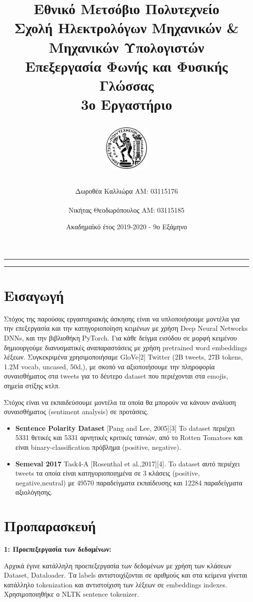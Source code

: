 \documentclass[12pt]{article}
\title{\Large Εθνικό Μετσόβιο Πολυτεχνείο \\
Σχολή Ηλεκτρολόγων Μηχανικών \& Μηχανικών Υπολογιστών\\
Επεξεργασία Φωνής και Φυσικής Γλώσσας\\
3ο Εργαστήριο \begin{figure}[h]
\centering
\includegraphics[width=0.2\textwidth]{ntua.jpg}
\end{figure}
}
\author{ \Large  Δωροθέα Καλλιώρα  ΑΜ: 03115176\\ \\
     \Large  Νικήτας Θεοδωρόπουλος AM: 03115185}
\date{Ακαδημαϊκό έτος 2019-2020 - 9ο Εξάμηνο}
\begin{document}
\maketitle
\begin{center}
\end{center}
\bigbreak
\vspace{.5em} \hrule \vspace{.2em} \hrule


\section{Εισαγωγή}


Στόχος της παρούσας εργαστηριακής άσκησης είναι να υπλοποιήσουμε μοντέλα για την επεξεργασία και την κατηγοριοποίηση κειμένων με χρήση Deep Neural Networks DNNs, και την βιβλιοθήκη PyTorch. Για κάθε δείγμα εισόδου σε μορφή κειμένου δημιουργούμε διανυσματικές αναπαραστάσεις με χρήση pretrained word embeddings λέξεων. Συγκεκριμένα χρησιμοποιήσαμε GloVe[2] Twitter (2B tweets, 27B tokens, 1.2M vocab, uncased, 50d,), με σκοπό να αξιοποιήσουμε την πληροφορία συναισθήματος στα tweets για το δέυτερο dataset που περιέχονται στα emojis, σημεία στίξης κτλπ. 

Στόχος είναι να εκπαιδεύσουμε μοντέλα τα οποία θα μπορούν να κάνουν ανάλυση συναισθήματος (sentiment analysis) σε προτάσεις. 

\begin{itemize}
    \item \textbf{Sentence Polarity Dataset} [Pang and Lee, 2005][3] To dataset περιέχει 5331 θετικές και 5331 αρνητικές κριτικές ταινιών, από το Rotten Tomatoes και είναι binary-classification πρόβλημα (positive, negative).
    \item \textbf{Semeval 2017} Task4-A [Rosenthal et al.,2017][4]. To dataset αυτό περιέχει tweets τα οποία είναι κατηγοριοποιημένα σε 3 κλάσεις (positive, negative,neutral) με 49570 παραδείγματα εκπαίδευσης και 12284 παραδείγματα αξιολόγησης.
\end{itemize}


\section{Προπαρασκευή}


\textbf{1: Προεπεξεργασία των δεδομένων:}

Αρχικά έγινε κατάλληλη προεπεξεργασία των δεδομένων με χρήση των κλάσεων Dataset, Dataloader. Τα labels αντιστοιχίζονται σε αριθμούς και στα κείμενα γίνεται κατάλληλο tokenization και αντιστοίχιση των λέξεων σε embeddings indexes. Χρησιμοποιηθήκε ο NLTK sentence tokenizer. 
\end{document}
